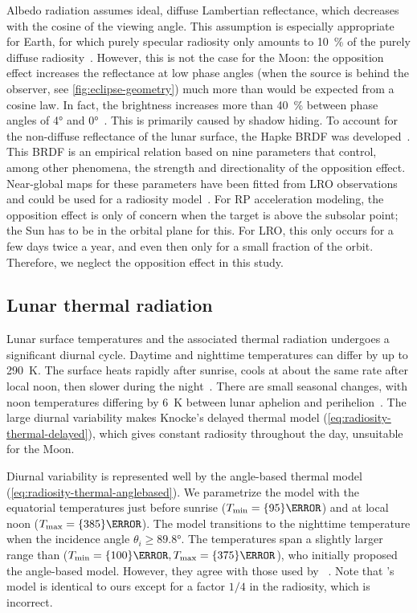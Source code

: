 Albedo radiation assumes ideal, diffuse Lambertian reflectance, which decreases with the cosine of the viewing angle. This assumption is especially appropriate for Earth, for which purely specular radiosity only amounts to \qty{10}{\percent} of the purely diffuse radiosity~\cite{Knocke1988}. However, this is not the case for the Moon: the opposition effect increases the reflectance at low phase angles (when the source is behind the observer, see \cref{fig:eclipse-geometry}) much more than would be expected from a cosine law. In fact, the brightness increases more than \qty{40}{\percent} between phase angles of \ang{4} and \ang{0}~\cite{Buratti1996}. This is primarily caused by shadow hiding. To account for the non-diffuse reflectance of the lunar surface, the Hapke \gls{BRDF} was developed~\cite{Hapke2012}. This \gls{BRDF} is an empirical relation based on nine parameters that control, among other phenomena, the strength and directionality of the opposition effect. Near-global maps for these parameters have been fitted from \gls{LRO} observations and could be used for a radiosity model~\cite{Sato2014}. For \gls{RP} acceleration modeling, the opposition effect is only of concern when the target is above the subsolar point; the Sun has to be in the orbital plane for this. For \gls{LRO}, this only occurs for a few days twice a year, and even then only for a small fraction of the orbit. Therefore, we neglect the opposition effect in this study.




\subsection{Lunar thermal radiation}

Lunar surface temperatures and the associated thermal radiation undergoes a significant diurnal cycle. Daytime and nighttime temperatures can differ by up to \qty{290}{\K}. The surface heats rapidly after sunrise, cools at about the same rate after local noon, then slower during the night~\cite{Vasavada2012}. There are small seasonal changes, with noon temperatures differing by \qty{6}{\K} between lunar aphelion and perihelion~\cite{Heiken1991}. The large diurnal variability makes Knocke's delayed thermal model (\cref{eq:radiosity-thermal-delayed}), which gives constant radiosity throughout the day, unsuitable for the Moon.

Diurnal variability is represented well by the angle-based thermal model (\cref{eq:radiosity-thermal-anglebased}). We parametrize the model with the equatorial temperatures just before sunrise ($T_\textnormal{min} = \qty{95}{\K}$) and at local noon ($T_\textnormal{max} = \qty{385}{\K}$). The model transitions to the nighttime temperature when the incidence angle $\theta_i \geq \ang{89.8}$. The temperatures span a slightly larger range than \citeauthor{Lemoine2013} ($T_\textnormal{min} = \qty{100}{\K}, T_\textnormal{max} = \qty{375}{\K}$), who initially proposed the angle-based model. However, they agree with those used by \citeauthor{Park2011}~\cite{Park2011}. Note that \citeauthor{Park2011}'s model is identical to ours except for a factor $1/4$ in the radiosity, which is incorrect.

